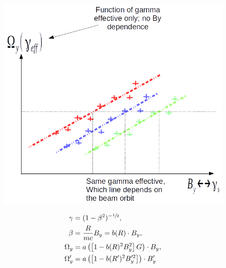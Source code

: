 \documentclass{article}
\newcommand{\Wy}{\Omega_y}
\begin{document}
	\begin{figure}[h]
		\centering
		\includegraphics[scale=.5]{img/Argument2}
	\end{figure}
	
	\begin{align*}
		\gamma &= (1-\beta^2)^{-\sfrac12}, \\
		\beta &= \frac{R}{mc} B_y = b(R)\cdot B_y,\\
		\Wy &= a\bkt{\bkt*{1-b(R)^2B_y^2}G} \cdot B_y,\\
		\Wy' &=a\bkt{\bkt*{1-b(R')^2B_y'^2}}\cdot B_y'
	\end{align*}
	
	
\end{document}
